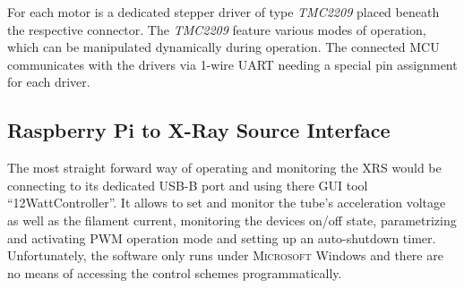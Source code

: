             For each motor is a dedicated stepper driver of type \textit{TMC2209} placed beneath the respective connector.
            The \textit{TMC2209} feature various modes of operation, which can be manipulated dynamically during operation.
            The connected MCU communicates with the drivers via 1-wire UART needing a special pin assignment for each driver.

        \subsection{Raspberry Pi to X-Ray Source Interface}
            The most straight forward way of operating and monitoring the XRS would be connecting to its dedicated USB-B port and using there GUI tool ``12WattController''.
            It allows to set and monitor the tube's acceleration voltage as well as the filament current, monitoring the devices on/off state, parametrizing and activating PWM operation mode and setting up an auto-shutdown timer.
            Unfortunately, the software only runs under \textsc{Microsoft} Windows and there are no means of accessing the control schemes programmatically.\par\medskip

